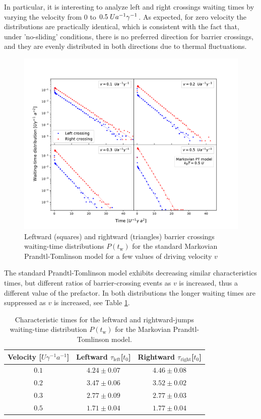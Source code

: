 In particular, it is interesting to analyze left and right crossings waiting times by varying the velocity from $0$ to $0.5 \hspace{0.1cm} U a^{-1} \gamma^{-1}$. As expected, for zero velocity the distributions are practically identical, which is consistent with the fact that, under 'no-sliding' conditions, there is no preferred direction for barrier crossings, and they are evenly distributed in both directions due to thermal fluctuations.
\begin{figure}[ht!]
    \centering
    \includegraphics[width=\textwidth]{sxdx_simplePT_DEFINITIVO.pdf}
    \caption{Leftward (squares) and rightward (triangles) barrier crossings waiting-time distributions $P(t_\text{w})$ for the standard Markovian Prandtl-Tomlinson model for a few values of driving velocity $v$}
    \label{fig:simplePT_sxdx}
\end{figure}

The standard Prandtl-Tomlinson model exhibits decreasing similar characteristics times, but different ratios of barrier-crossing events as $v$ is increased, thus a different value of the prefactor. In both distributions the longer waiting times are suppressed as $v$ is increased, see Table \ref{tab:sxdx_simplePT}.
\begin{table}
\centering 
\begin{tabular}{ccc}
    \toprule
    Velocity [$U \gamma ^{-1} a^{-1}$] & Leftward $\tau_\text{left} $[$t_0$] & Rightward $\tau_\text{right} $[$t_0$]\\
    \midrule 
    $0.1$ & $4.24 \pm 0.07$ & $4.46 \pm 0.08$\\
    $0.2$ & $3.47 \pm 0.06$ & $3.52 \pm 0.02$ \\
    $0.3$ & $2.77 \pm 0.09$ & $2.77 \pm 0.03$\\
    $0.5$ & $1.71\pm 0.04$ & $1.77 \pm 0.04$\\
    \bottomrule
\end{tabular}
\caption{Characteristic times for the leftward and rightward-jumps waiting-time distribution $P(t_\text{w})$ for the Markovian Prandtl-Tomlinson model.}
\label{tab:sxdx_simplePT}
\end{table}

